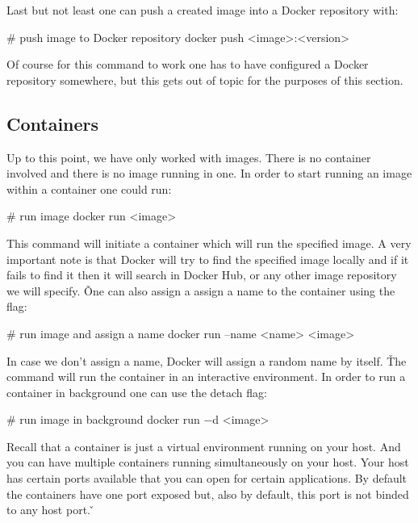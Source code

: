 Last but not least one can push a created image into a Docker repository with:

\begin{bash}
# push image to Docker repository
docker push <image>:<version>
\end{bash}

Of course for this command to work one has to have configured a Docker repository somewhere, but this gets out of
topic for the purposes of this section.

\subsection{Containers}

Up to this point, we have only worked with images. There is no container involved and there is no image running in
one. In order to start running an image within a container one could run:

\begin{bash}
# run image
docker run <image>
\end{bash}

This command will initiate a container which will run the specified image. A very important note is that Docker will
try to find the specified image locally and if it fails to find it then it will search in Docker Hub, or any other
image repository we will specify. \v

One can also assign a assign a name to the container using the  flag:

\begin{bash}
# run image and assign a name
docker run --name <name> <image>
\end{bash}

In case we don't assign a name, Docker will assign a random name by itself. \v

The  command will run the container in an interactive environment. In order to run a container in
background one can use the detach  flag:

\begin{bash}
# run image in background
docker run $-$d <image>
\end{bash}

Recall that a container is just a virtual environment running on your host. And you can have multiple containers
running simultaneously on your host. Your host has certain ports available that you can open for certain applications.
By default the containers have one port exposed but, also by default, this port is not binded to any host port. \v

